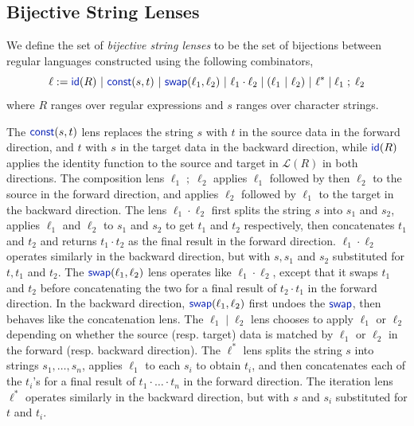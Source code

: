 \documentclass[acmsmall,screen]{acmart}
\newcommand{\kw}[1]{\textcolor{dkblue}{\ensuremath{\mathsf{#1}}}}
\newcommand{\sep}{\ensuremath{\ | \ }}
\newcommand{\const}{\ensuremath{\kw{const}}}
\newcommand{\swap}{\ensuremath{\kw{swap}}}
\newcommand{\id}{\ensuremath{\kw{id}}}
\begin{document}
\subsection{Bijective String Lenses}
\label{subsec:bijective-lenses}
We define the set of \textit{bijective string lenses} to be the set of
bijections between regular languages constructed using the following
combinators,
$$\ell := \id(R) \sep \const(s, t) \sep  \swap(\ell_1, \ell_2)
\sep \ell_1 \cdot \ell_2 \; |  \; (\ell_1 \sep \ell_2) \sep \ell^* \; | \;
\ell_1 \; ; \;  \ell_2$$
where $R$ ranges over regular expressions and $s$ ranges over character strings.

The $\mathit{\const}(s, t)$ lens replaces the string $s$ with $t$ in the source
data in the forward direction, and $t$ with $s$ in the target data in the
backward direction, while $\kw{id}(R)$ applies the identity function to the
source and target  in $\mathcal{L}(R)$ in both directions. The composition lens
$\ell_1 \; ; \; \ell_2$ applies $\ell_1$ followed by then $\ell_2$ to the
source in the forward direction, and applies $\ell_2$ followed by $\ell_1$ to
the target in the backward direction. The lens $\ell_1 \cdot \ell_2$ first
splits the string $s$ into $s_1$ and $s_2$, applies $\ell_1$ and $\ell_2$ to
$s_1$ and $s_2$ to get $t_1$ and $t_2$ respectively, then concatenates $t_1$
and $t_2$ and returns $t_1 \cdot t_2$ as the final result in the forward
direction. $\ell_1 \cdot \ell_2$ operates similarly in the backward direction,
but with $s, s_1$ and $s_2$ substituted for $t, t_1$ and $t_2$. The
$\swap(\ell_1, \ell_2)$ lens operates like $\ell_1 \cdot \ell_2$,
except that it swaps $t_1$ and $t_2$ before concatenating the two for a final
result of $t_2 \cdot t_1$ in the forward direction. In the backward direction,
$\swap(\ell_1, \ell_2)$ first undoes the \swap, then behaves like
the concatenation lens. The $\ell_1 \; | \; \ell_2$ lens chooses to apply
$\ell_1$ or $\ell_2$ depending on whether the source (resp. target) data is
matched by $\ell_1$ or $\ell_2$ in the forward (resp. backward direction). The
$\ell^*$ lens splits the string $s$ into strings $s_1, \ldots, s_n$, applies
$\ell_1$ to each $s_i$ to obtain $t_i$, and then concatenates each of the $t_i$'s
for a final result of $t_1 \cdot \ldots \cdot t_n$ in the forward direction.
The iteration lens $\ell^*$ operates similarly in the backward direction, but
with $s$ and $s_i$ substituted for $t$ and $t_i$.
\end{document}
